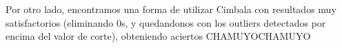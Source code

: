 Por otro lado, encontramos una forma de utilizar Cimbala con resultados muy satisfactorios (eliminando 0s, y quedandonos con los outliers detectados por encima del valor de corte), obteniendo aciertos CHAMUYOCHAMUYO


